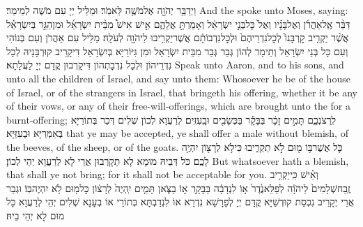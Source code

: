 {וַיְדַבֵּ֥ר יְהֹוָ֖ה אֶל\maqqaf מֹשֶׁ֥ה לֵּאמֹֽר׃}
{וּמַלֵּיל יְיָ עִם מֹשֶׁה לְמֵימַר׃}
{And the \lord\space spoke unto Moses, saying:}{}
{דַּבֵּ֨ר אֶֽל\maqqaf אַהֲרֹ֜ן וְאֶל\maqqaf בָּנָ֗יו וְאֶל֙ כׇּל\maqqaf בְּנֵ֣י יִשְׂרָאֵ֔ל וְאָמַרְתָּ֖ אֲלֵהֶ֑ם אִ֣ישׁ אִישׁ֩ מִבֵּ֨ית יִשְׂרָאֵ֜ל וּמִן\maqqaf הַגֵּ֣ר בְּיִשְׂרָאֵ֗ל אֲשֶׁ֨ר יַקְרִ֤יב קׇרְבָּנוֹ֙ לְכׇל\maqqaf נִדְרֵיהֶם֙ וּלְכׇל\maqqaf נִדְבוֹתָ֔ם אֲשֶׁר\maqqaf יַקְרִ֥יבוּ לַיהֹוָ֖ה לְעֹלָֽה׃}
{מַלֵּיל עִם אַהֲרֹן וְעִם בְּנוֹהִי וְעִם כָּל בְּנֵי יִשְׂרָאֵל וְתֵימַר לְהוֹן גְּבַר גְּבַר מִבֵּית יִשְׂרָאֵל וּמִן גִּיּוֹרַיָּא בְּיִשְׂרָאֵל דִּיקָרֵיב קוּרְבָּנֵיהּ לְכָל נִדְרֵיהוֹן וּלְכָל נִדְבָתְהוֹן דִּיקָרְבוּן קֳדָם יְיָ לַעֲלָתָא׃}
{Speak unto Aaron, and to his sons, and unto all the children of Israel, and say unto them: Whosoever he be of the house of Israel, or of the strangers in Israel, that bringeth his offering, whether it be any of their vows, or any of their free-will-offerings, which are brought unto the \lord\space for a burnt-offering;}{}
{לִֽרְצֹנְכֶ֑ם תָּמִ֣ים זָכָ֔ר בַּבָּקָ֕ר בַּכְּשָׂבִ֖ים וּבָֽעִזִּֽים׃}
{לְרַעֲוָא לְכוֹן שְׁלִים דְּכַר בְּתוֹרַיָּא בְּאִמְּרַיָּא וּבְעִזַּיָּא׃}
{that ye may be accepted, ye shall offer a male without blemish, of the beeves, of the sheep, or of the goats.}{}
{כֹּ֛ל אֲשֶׁר\maqqaf בּ֥וֹ מ֖וּם לֹ֣א תַקְרִ֑יבוּ כִּי\maqqaf לֹ֥א לְרָצ֖וֹן יִהְיֶ֥ה לָכֶֽם׃}
{כֹּל דְּבֵיהּ מוּמָא לָא תְקָרְבוּן אֲרֵי לָא לְרַעֲוָא יְהֵי לְכוֹן׃}
{But whatsoever hath a blemish, that shall ye not bring; for it shall not be acceptable for you.}{}
{וְאִ֗ישׁ כִּֽי\maqqaf יַקְרִ֤יב זֶֽבַח\maqqaf שְׁלָמִים֙ לַיהֹוָ֔ה לְפַלֵּא\maqqaf נֶ֙דֶר֙ א֣וֹ לִנְדָבָ֔ה בַּבָּקָ֖ר א֣וֹ בַצֹּ֑אן תָּמִ֤ים יִֽהְיֶה֙ לְרָצ֔וֹן כׇּל\maqqaf מ֖וּם לֹ֥א יִהְיֶה\maqqaf בּֽוֹ׃}
{וּגְבַר אֲרֵי יְקָרֵיב נִכְסַת קוּדְשַׁיָּא קֳדָם יְיָ לְפָרָשָׁא נִדְרָא אוֹ לִנְדַבְתָּא בְּתוֹרֵי אוֹ בְעָנָא שְׁלִים יְהֵי לְרַעֲוָא כָּל מוּם לָא יְהֵי בֵיהּ׃}
